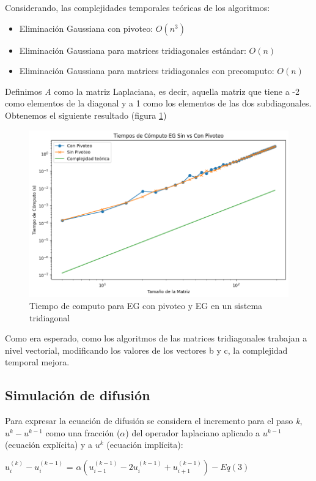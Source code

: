 Considerando, las complejidades temporales teóricas de los algoritmos:

\begin{itemize}
    \item Eliminación Gaussiana con pivoteo: $O(n^{3})$
    \item Eliminación Gaussiana para matrices tridiagonales estándar: $O(n)$
    \item Eliminación Gaussiana para matrices tridiagonales con precomputo: $O(n)$
\end{itemize}


Definimos \textit{A} como la matriz Laplaciana, es decir, aquella matriz que tiene a -2 como elementos de la diagonal y a 1 como los elementos de las dos subdiagonales. Obtenemos el siguiente resultado (figura \ref{result_ej5})

\begin{figure}[H]
\centerline{\includegraphics[scale=0.45]{./img/tiempos_EGsinVsConPivoteo.png}}
\caption{Tiempo de computo para EG con pivoteo y EG en un sistema tridiagonal}
\label{result_ej5}
\end{figure}

Como era esperado, como los algoritmos de las matrices tridiagonales trabajan a nivel vectorial, modificando los valores de los vectores b y c, la complejidad temporal mejora.



\subsection{Simulación de difusión}

Para expresar la ecuación de difusión se considera el incremento para el paso \textit{k}, $u^k - u^{k-1}$ como una
fracción ($\alpha$) del operador laplaciano aplicado a $u^{k-1}$ (ecuación explícita) y a $u^{k}$ (ecuación implícita):
\begin{center}
  $u_i^{(k)} - u_i^{(k-1)}$ = $\alpha(u_{i-1}^{(k-1)} - 2u_i^{(k-1)} + u_{i+1}^{(k-1)}) - Eq (3)$
\end{center}

